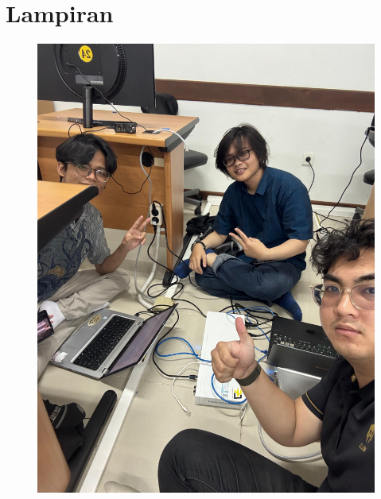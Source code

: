\section{Lampiran}
\begin{figure}[H]
    \centering
    \includegraphics[width=0.65\linewidth]{image/dokum.jpg}
\end{figure}
